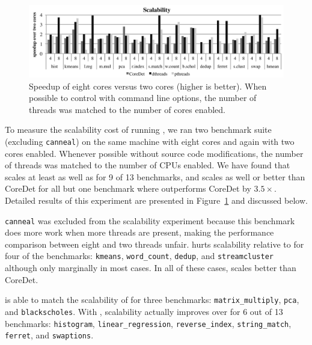 \label{sec:scalability}

\begin{figure}
{\centering
\includegraphics[width=6in]{dthreads/figure/scalability-figure}
\caption{Speedup of eight cores versus two cores (higher is better).  When possible to control with command line options, the number of threads was matched to the number of cores enabled.\label{fig:scalability}}
}
\end{figure}

To measure the scalability cost of running \dthreads{}, we ran two benchmark suite (excluding \texttt{canneal}) on the same machine with eight cores and again with two cores enabled.  Whenever possible without source code modifications, the number of threads was matched to the number of CPUs enabled.  We have found that \dthreads{} scales at least as well as \pthreads{} for 9 of 13 benchmarks, and scales as well or better than CoreDet for all but one benchmark where \dthreads{} outperforms CoreDet by $3.5\times$.  Detailed results of this experiment are presented in Figure~\ref{fig:scalability} and discussed below.

\texttt{canneal} was excluded from the scalability experiment because this benchmark does more work when more threads are present, making the performance comparison between eight and two threads unfair.  \dthreads{} hurts scalability relative to \pthreads{} for four of the benchmarks: \texttt{kmeans}, \texttt{word\_count}, \texttt{dedup}, and \texttt{streamcluster} although only marginally in most cases.  In all of these cases, \dthreads{} scales better than CoreDet.

\dthreads{} is able to match the scalability of \pthreads{} for three benchmarks: \texttt{matrix\_multiply}, \texttt{pca}, and \texttt{blackscholes}.  With \dthreads{}, scalability actually improves over \pthreads{} for 6 out of 13 benchmarks: \texttt{histogram}, \texttt{linear\_regression}, \texttt{reverse\_index}, \texttt{string\_match}, \texttt{ferret}, and \texttt{swaptions}.

